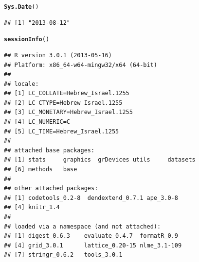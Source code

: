 \documentclass[shortnames,nojss,article]{jss}\usepackage[]{graphicx}\usepackage[]{color}
\makeatletter
\newcommand{\hlstd}[1]{\textcolor[rgb]{0.345,0.345,0.345}{#1}}%
\newcommand{\hlkwd}[1]{\textcolor[rgb]{0.737,0.353,0.396}{\textbf{#1}}}%
\newenvironment{kframe}{%
 \def\at@end@of@kframe{}%
 \ifinner\ifhmode%
  \def\at@end@of@kframe{\end{minipage}}%
  \begin{minipage}{\columnwidth}%
 \fi\fi%
 \def\FrameCommand##1{\hskip\@totalleftmargin \hskip-\fboxsep
 \colorbox{shadecolor}{##1}\hskip-\fboxsep
     \hskip-\linewidth \hskip-\@totalleftmargin \hskip\columnwidth}%
 \MakeFramed {\advance\hsize-\width
   \@totalleftmargin\z@ \linewidth\hsize
   \@setminipage}}%
 {\par\unskip\endMakeFramed%
 \at@end@of@kframe}
\newenvironment{knitrout}{}{} %
\makeatother
\begin{document}
\begin{knitrout}
\color{fgcolor}\begin{kframe}
\begin{alltt}
\hlkwd{Sys.Date}\hlstd{()}
\end{alltt}
\begin{verbatim}
## [1] "2013-08-12"
\end{verbatim}
\begin{alltt}
\hlkwd{sessionInfo}\hlstd{()}
\end{alltt}
\begin{verbatim}
## R version 3.0.1 (2013-05-16)
## Platform: x86_64-w64-mingw32/x64 (64-bit)
## 
## locale:
## [1] LC_COLLATE=Hebrew_Israel.1255 
## [2] LC_CTYPE=Hebrew_Israel.1255   
## [3] LC_MONETARY=Hebrew_Israel.1255
## [4] LC_NUMERIC=C                  
## [5] LC_TIME=Hebrew_Israel.1255    
## 
## attached base packages:
## [1] stats     graphics  grDevices utils     datasets 
## [6] methods   base     
## 
## other attached packages:
## [1] codetools_0.2-8  dendextend_0.7.1 ape_3.0-8       
## [4] knitr_1.4       
## 
## loaded via a namespace (and not attached):
## [1] digest_0.6.3    evaluate_0.4.7  formatR_0.9    
## [4] grid_3.0.1      lattice_0.20-15 nlme_3.1-109   
## [7] stringr_0.6.2   tools_3.0.1
\end{verbatim}
\end{kframe}
\end{knitrout}
\end{document}
